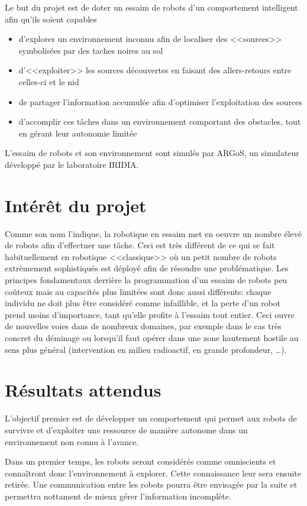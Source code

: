 Le but du projet est de doter un essaim de robots d'un comportement intelligent afin qu'ils soient capables \cite{cahierCharges}
\begin{itemize}
  \item d'explorer un environnement inconnu afin de localiser des <<sources>> symbolisées par des taches noires au sol
  \item d'<<exploiter>> les sources découvertes en faisant des allers-retours entre celles-ci et le nid
  \item de partager l'information accumulée afin d'optimiser l'exploitation des sources
  \item d'accomplir ces tâches dans un environnement comportant des obstacles, tout en gérant leur autonomie limitée
\end{itemize}
L'essaim de robots et son environnement sont simulés par ARGoS, un simulateur développé par le laboratoire IRIDIA.

\section{Intérêt du projet}

Comme son nom l'indique, la robotique en essaim met en oeuvre un nombre élevé de robots afin d'effectuer une tâche. Ceci est très différent de ce qui se fait habituellement en robotique <<classique>> où un petit nombre de robots extrèmement sophistiqués est déployé afin de résoudre une problématique. Les principes fondamentaux derrière la programmation d'un essaim de robots peu coûteux mais au capacités plus limitées sont donc aussi différents: chaque individu ne doit plus être considéré comme infaillible, et la perte d'un robot prend moins d'importance, tant qu'elle profite à l'essaim tout entier. Ceci ouvre de nouvelles voies dans de nombreux domaines, par exemple dans le cas très concret du déminage ou lorsqu'il faut opérer dans une zone hautement hostile au sens plus général (intervention en milieu radioactif, en grande profondeur, \ldots).~\cite{swarmMini}

\section{Résultats attendus}

L'objectif premier est de développer un comportement qui permet aux robots de survivre et d'exploiter une ressource de manière autonome dans un environnement non connu à l'avance.

Dans un premier temps, les robots seront considérés comme omniscients et connaîtront donc l'environnement à explorer. Cette connaissance leur sera ensuite retirée. Une communication entre les robots pourra être envisagée par la suite et permettra nottament de mieux gérer l'information incomplète.

